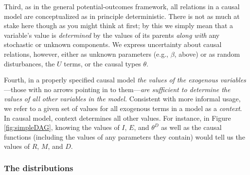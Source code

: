 \documentclass[
  12pt,
]{book}
\begin{document}
Third, as in the general potential-outcomes framework, all relations in a causal model are conceptualized as in principle deterministic. There is not as much at stake here though as you might think at first; by this we simply mean that a variable's value is \emph{determined} by the values of its parents \emph{along with} any stochastic or unknown components. We express uncertainty about causal relations, however, either as unknown parameters (e.g., \(\beta\), above) or as random disturbances, the \(U\) terms, or the causal types \(\theta\).

Fourth, in a properly specified causal model \emph{the values of the exogenous variables}---those with no arrows pointing in to them---\emph{are sufficient to determine the values of all other variables in the model.} Consistent with more informal usage, we refer to a given set of values for all exogenous terms in a model as a \emph{context}. In causal model, context determines all other values. For instance, in Figure \ref{fig:simpleDAG}, knowing the values of \(I\), \(E\), and \(\theta^D\) as well as the causal functions (including the values of any parameters they contain) would tell us the values of \(R\), \(M\), and \(D\).

\hypertarget{the-distributions}{%
\subsubsection{The distributions}\label{the-distributions}}
\end{document}
